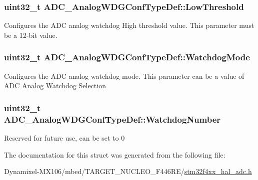 \subsubsection[{\texorpdfstring{Low\+Threshold}{LowThreshold}}]{\setlength{\rightskip}{0pt plus 5cm}uint32\+\_\+t A\+D\+C\+\_\+\+Analog\+W\+D\+G\+Conf\+Type\+Def\+::\+Low\+Threshold}\hypertarget{struct_a_d_c___analog_w_d_g_conf_type_def_a77e1743ebd27333ac2c9de55a25cd4c8}{}\label{struct_a_d_c___analog_w_d_g_conf_type_def_a77e1743ebd27333ac2c9de55a25cd4c8}
Configures the A\+DC analog watchdog High threshold value. This parameter must be a 12-\/bit value. 
\subsubsection[{\texorpdfstring{Watchdog\+Mode}{WatchdogMode}}]{\setlength{\rightskip}{0pt plus 5cm}uint32\+\_\+t A\+D\+C\+\_\+\+Analog\+W\+D\+G\+Conf\+Type\+Def\+::\+Watchdog\+Mode}\hypertarget{struct_a_d_c___analog_w_d_g_conf_type_def_ad4c60783321a30e8edffa323148e424d}{}\label{struct_a_d_c___analog_w_d_g_conf_type_def_ad4c60783321a30e8edffa323148e424d}
Configures the A\+DC analog watchdog mode. This parameter can be a value of \hyperlink{group___a_d_c__analog__watchdog__selection}{A\+DC Analog Watchdog Selection} 
\subsubsection[{\texorpdfstring{Watchdog\+Number}{WatchdogNumber}}]{\setlength{\rightskip}{0pt plus 5cm}uint32\+\_\+t A\+D\+C\+\_\+\+Analog\+W\+D\+G\+Conf\+Type\+Def\+::\+Watchdog\+Number}\hypertarget{struct_a_d_c___analog_w_d_g_conf_type_def_a025e81af21b93c5b8daf9f5241383302}{}\label{struct_a_d_c___analog_w_d_g_conf_type_def_a025e81af21b93c5b8daf9f5241383302}
Reserved for future use, can be set to 0 

The documentation for this struct was generated from the following file\+:\begin{DoxyCompactItemize}
\item 
Dynamixel-\/\+M\+X106/mbed/\+T\+A\+R\+G\+E\+T\+\_\+\+N\+U\+C\+L\+E\+O\+\_\+\+F446\+R\+E/\hyperlink{stm32f4xx__hal__adc_8h}{stm32f4xx\+\_\+hal\+\_\+adc.\+h}\end{DoxyCompactItemize}
